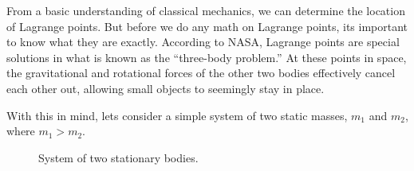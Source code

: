 From a basic understanding of classical mechanics, we can determine the location of Lagrange points. But before we do any math on Lagrange points, its important to know what they are exactly. According to NASA, Lagrange points are special solutions in what is known as the ``three-body problem.'' At these points in space, the gravitational and rotational forces of the other two bodies effectively cancel each other out, allowing small objects to seemingly stay in place\autocite{JWSTOrbit}.

With this in mind, lets consider a simple system of two static masses, $m_1$ and $m_2$, where $m_1 > m_2$.

\vspace*{0.5cm}
\begin{figure}[!h]
	\centering
	\vspace*{0.25cm}
	\caption{System of two stationary bodies.}
	\label{fig:collinear-coords}
\end{figure}

